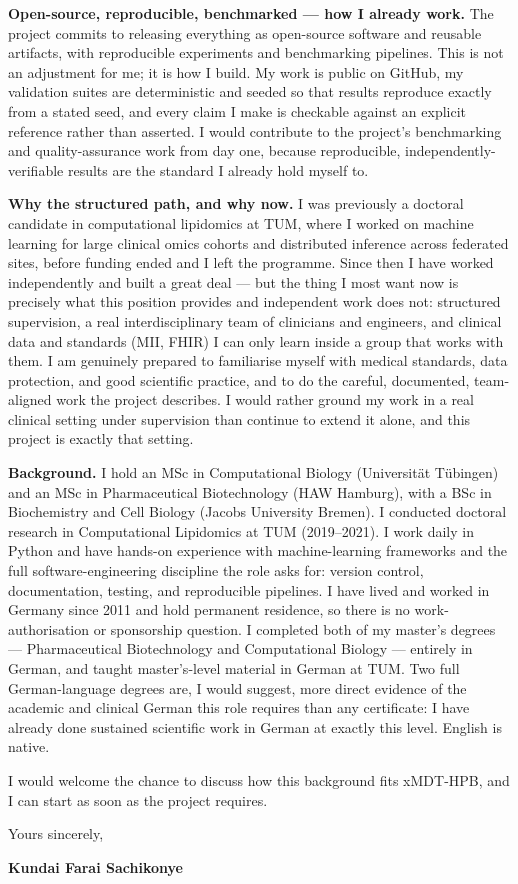 \documentclass[12pt,a4paper]{article}
\begin{document}
\textbf{Open-source, reproducible, benchmarked --- how I already work.}
The project commits to releasing everything as open-source software and
reusable artifacts, with reproducible experiments and benchmarking pipelines.
This is not an adjustment for me; it is how I build.
My work is public on GitHub, my validation suites are deterministic and
seeded so that results reproduce exactly from a stated seed, and every claim I
make is checkable against an explicit reference rather than asserted.
I would contribute to the project's benchmarking and quality-assurance work
from day one, because reproducible, independently-verifiable results are the
standard I already hold myself to.

\textbf{Why the structured path, and why now.}
I was previously a doctoral candidate in computational lipidomics at TUM, where
I worked on machine learning for large clinical omics cohorts and distributed
inference across federated sites, before funding ended and I left the programme.
Since then I have worked independently and built a great deal --- but the thing
I most want now is precisely what this position provides and independent work
does not: structured supervision, a real interdisciplinary team of clinicians
and engineers, and clinical data and standards (MII, FHIR) I can only learn
inside a group that works with them.
I am genuinely prepared to familiarise myself with medical standards, data
protection, and good scientific practice, and to do the careful, documented,
team-aligned work the project describes.
I would rather ground my work in a real clinical setting under supervision than
continue to extend it alone, and this project is exactly that setting.

\textbf{Background.}
I hold an MSc in Computational Biology (Universität Tübingen) and an MSc in
Pharmaceutical Biotechnology (HAW Hamburg), with a BSc in Biochemistry and Cell
Biology (Jacobs University Bremen).
I conducted doctoral research in Computational Lipidomics at TUM (2019--2021).
I work daily in Python and have hands-on experience with machine-learning
frameworks and the full software-engineering discipline the role asks for:
version control, documentation, testing, and reproducible pipelines.
I have lived and worked in Germany since 2011 and hold permanent residence, so
there is no work-authorisation or sponsorship question.
I completed both of my master's degrees --- Pharmaceutical Biotechnology and
Computational Biology --- entirely in German, and taught master's-level material
in German at TUM.
Two full German-language degrees are, I would suggest, more direct evidence of
the academic and clinical German this role requires than any certificate:
I have already done sustained scientific work in German at exactly this level.
English is native.

I would welcome the chance to discuss how this background fits xMDT-HPB, and I
can start as soon as the project requires.

\vspace{1.5em}
Yours sincerely,

\vspace{2.5em}
\textbf{Kundai Farai Sachikonye}
\end{document}
